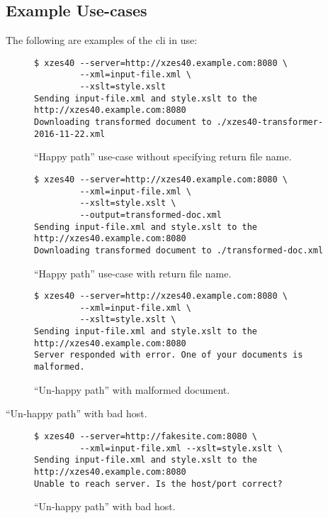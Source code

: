 \subsection{Example Use-cases}

The following are examples of the \gls{cli} in use:

\begin{figure}
    \begin{lstlisting}
$ xzes40 --server=http://xzes40.example.com:8080 \
         --xml=input-file.xml \
         --xslt=style.xslt
Sending input-file.xml and style.xslt to the http://xzes40.example.com:8080
Downloading transformed document to ./xzes40-transformer-2016-11-22.xml
    \end{lstlisting}
    \caption{``Happy path'' use-case without specifying return file name.}
\end{figure}


\begin{figure}
    \begin{lstlisting}
$ xzes40 --server=http://xzes40.example.com:8080 \
	     --xml=input-file.xml \
         --xslt=style.xslt \
         --output=transformed-doc.xml
Sending input-file.xml and style.xslt to the http://xzes40.example.com:8080
Downloading transformed document to ./transformed-doc.xml
    \end{lstlisting}
   \caption{``Happy path'' use-case with return file name.}
\end{figure}

\begin{figure}
    \begin{lstlisting}
$ xzes40 --server=http://xzes40.example.com:8080 \
         --xml=input-file.xml \
         --xslt=style.xslt \
Sending input-file.xml and style.xslt to the http://xzes40.example.com:8080
Server responded with error. One of your documents is malformed.
    \end{lstlisting}
    \caption{``Un-happy path'' with malformed document.}
\end{figure}


``Un-happy path'' with bad host.
\begin{figure}
\begin{lstlisting}
$ xzes40 --server=http://fakesite.com:8080 \
         --xml=input-file.xml --xslt=style.xslt \
Sending input-file.xml and style.xslt to the http://xzes40.example.com:8080
Unable to reach server. Is the host/port correct?
\end{lstlisting}
\caption{``Un-happy path'' with bad host.}
\end{figure}

